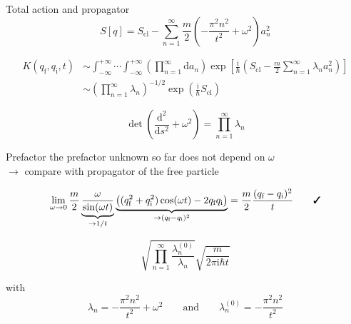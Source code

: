 \documentclass[t,dvipsnames]{beamer}
\begin{document}
\begin{frame}[c]{Total action and propagator}
 \begin{displaymath}
  S[q] = S_\text{cl}-\sum_{n=1}^{\infty}\frac{m}{2}\left(-\frac{\pi^2n^2}{t^2}+\omega^2\right)a_n^2
 \end{displaymath}

 \begin{displaymath}
  \begin{aligned}
   K(q_\text{f}, q_\text{i},t) &\sim \int_{-\infty}^{+\infty}\cdots\int_{-\infty}^{+\infty} 
     \left(\prod_{n=1}^\infty\text{d}a_n\right)\exp\left[\frac{\text{i}}{\hbar}\left(
       S_\text{cl}-\frac{m}{2}\sum_{n=1}^\infty\lambda_na_n^2\right)\right]\\
   &\sim \left(\prod_{n=1}^\infty\lambda_n\right)^{-1/2}\exp\left(\frac{\text{i}}{\hbar}S_\text{cl}\right)
  \end{aligned}
 \end{displaymath}

 \begin{displaymath}
  \det\left(\frac{\text{d}^2}{\text{d}s^2}+\omega^2\right) = \prod_{n=1}^\infty\lambda_n
 \end{displaymath}
\end{frame}

\begin{frame}[c]{Prefactor}
 the prefactor unknown so far does not depend on $\omega$\\
 $\rightarrow$ compare with propagator of the free particle
 
 \vspace{0.3truecm}
 \begin{displaymath}
  \lim_{\omega\to 0}\frac{m}{2}\underbrace{\frac{\omega}{\sin(\omega t)}}_{\to 1/t}
    \underbrace{\big((q_\text{f}^2+q_\text{i}^2)\cos(\omega t)-2q_\text{f}q_\text{i}\big)}_{\to
	     (q_\text{f}-q_\text{i})^2}
   = \frac{m}{2}\frac{(q_\text{f}-q_\text{i})^2}{t}\qquad\text{\ding{51}}
 \end{displaymath}

 \begin{displaymath}
  \sqrt{\prod_{n=1}^\infty\frac{\lambda_n^{(0)}}{\lambda_n}}\sqrt{\frac{m}{2\pi\text{i}\hbar t}}
 \end{displaymath}

 with
 \begin{displaymath}
  \lambda_n = -\frac{\pi^2n^2}{t^2}+\omega^2\qquad\text{and}\qquad
  \lambda_n^{(0)} = -\frac{\pi^2n^2}{t^2}
 \end{displaymath}
\end{frame}
\end{document}
